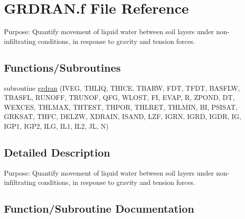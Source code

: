 \hypertarget{GRDRAN_8f}{}\section{G\+R\+D\+R\+A\+N.\+f File Reference}
\label{GRDRAN_8f}


Purpose\+: Quantify movement of liquid water between soil layers under non-\/infiltrating conditions, in response to gravity and tension forces.  


\subsection*{Functions/\+Subroutines}
\begin{DoxyCompactItemize}
\item 
subroutine \hyperlink{GRDRAN_8f_a9d02aa9115635af052981eec146b1042}{grdran} (I\+V\+E\+G, T\+H\+L\+I\+Q, T\+H\+I\+C\+E, T\+B\+A\+R\+W, F\+D\+T, T\+F\+D\+T, B\+A\+S\+F\+L\+W, T\+B\+A\+S\+F\+L, R\+U\+N\+O\+F\+F, T\+R\+U\+N\+O\+F, Q\+F\+G, W\+L\+O\+S\+T, F\+I, E\+V\+A\+P, R, Z\+P\+O\+N\+D, D\+T, W\+E\+X\+C\+E\+S, T\+H\+L\+M\+A\+X, T\+H\+T\+E\+S\+T, T\+H\+P\+O\+R, T\+H\+L\+R\+E\+T, T\+H\+L\+M\+I\+N, B\+I, P\+S\+I\+S\+A\+T, G\+R\+K\+S\+A\+T, T\+H\+F\+C, D\+E\+L\+Z\+W, X\+D\+R\+A\+I\+N, I\+S\+A\+N\+D, L\+Z\+F, I\+G\+R\+N, I\+G\+R\+D, I\+G\+D\+R, I\+G, I\+G\+P1, I\+G\+P2, I\+L\+G, I\+L1, I\+L2, J\+L, N)
\end{DoxyCompactItemize}


\subsection{Detailed Description}
Purpose\+: Quantify movement of liquid water between soil layers under non-\/infiltrating conditions, in response to gravity and tension forces. 



\subsection{Function/\+Subroutine Documentation}
\hypertarget{GRDRAN_8f_a9d02aa9115635af052981eec146b1042}{}

